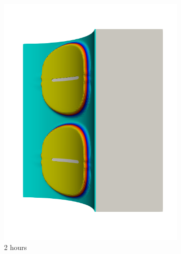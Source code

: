 \begin{figure}[!htb]
\begin{subfigure}[b]{0.2\textwidth}
    \includegraphics[width=\textwidth]{Chapter5/figures/spallation/seed_c_6}
    \caption{2 hours}
  \end{subfigure}
  \begin{subfigure}[b]{0.2\textwidth}
    \centering

\end{subfigure}
\end{figure}
